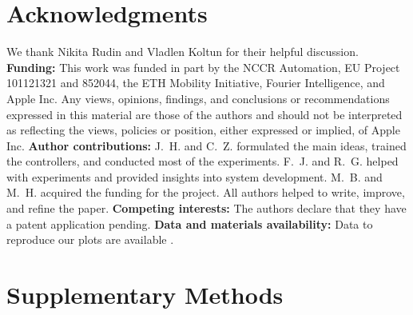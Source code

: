 \documentclass[9pt,twocolumn,twoside]{osajnl}
\newcommand\highlight[1]{#1}
\newcommand\highlight[1]{\textcolor{red}{#1}}
\begin{document}




% 


\section*{Acknowledgments}
We thank Nikita Rudin and Vladlen Koltun for their helpful discussion. 
\textbf{Funding:}
This work was funded in part by the NCCR Automation, EU Project 101121321 and 852044, the ETH Mobility Initiative, Fourier Intelligence, and Apple Inc. Any views, opinions, findings, and conclusions or recommendations expressed in this material are those of the authors and should not be interpreted as reflecting the views, policies or position, either expressed or implied, of Apple Inc. 
\textbf{Author contributions:} 
 J.~H. and C.~Z. formulated the main ideas, trained the controllers, and conducted most of the experiments. F.~J. and R.~G. helped with experiments and provided insights into system development. M.~B. and M.~H. acquired the funding for the project. All authors helped to write, improve, and refine the paper.  
\textbf{Competing interests:}
The authors declare that they have a patent application pending. 
\textbf{Data and materials availability:} Data to reproduce our plots are available \cite{data}.

\clearpage

\section*{\highlight{Supplementary Methods}}
\setcounter{figure}{0}
\renewcommand\thefigure{S\arabic{figure}}
\setcounter{table}{0}
\renewcommand\thetable{S\arabic{table}}
\end{document}
